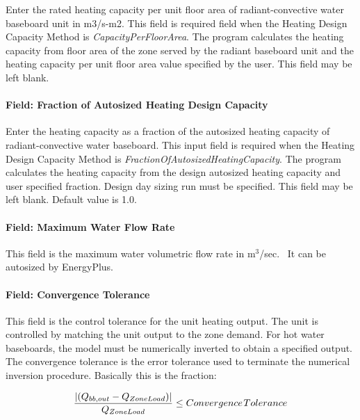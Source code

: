 Enter the rated heating capacity per unit floor area of radiant-convective water baseboard unit in m3/s-m2. This field is required field when the Heating Design Capacity Method is \emph{CapacityPerFloorArea}. The program calculates the heating capacity from floor area of the zone served by the radiant baseboard unit and the heating capacity per unit floor area value specified by the user. This field may be left blank.

\paragraph{Field: Fraction of Autosized Heating Design Capacity}\label{field-fraction-of-autosized-heating-design-capacity-000}

Enter the heating capacity as a fraction of the autosized heating capacity of radiant-convective water baseboard. This input field is required when the Heating Design Capacity Method is \emph{FractionOfAutosizedHeatingCapacity}. The program calculates the heating capacity from the design autosized heating capacity and user specified fraction. Design day sizing run must be specified. This field may be left blank. Default value is 1.0.

\paragraph{Field: Maximum Water Flow Rate}\label{field-maximum-water-flow-rate-001}

This field is the maximum water volumetric flow rate in m\(^{3}\)/sec.~ It can be autosized by EnergyPlus.

\paragraph{Field: Convergence Tolerance}\label{field-convergence-tolerance-000}

This field is the control tolerance for the unit heating output. The unit is controlled by matching the unit output to the zone demand. For hot water baseboards, the model must be numerically inverted to obtain a specified output. The convergence tolerance is the error tolerance used to terminate the numerical inversion procedure. Basically this is the fraction:

\begin{equation}
\frac{{\left| {({Q_{bb,out}} - {Q_{ZoneLoad}})} \right|}}{{{Q_{ZoneLoad}}}} \le Convergence{\kern 1pt} Tolerance
\end{equation}

